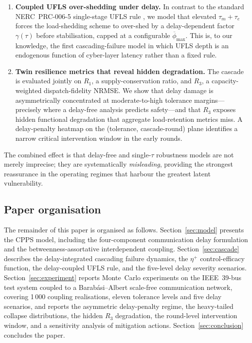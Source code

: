 \begin{enumerate}
\item \textbf{Coupled UFLS over-shedding under delay.}  In contrast
  to the standard NERC~PRC-006-5 single-stage UFLS rule
  \citep{NERC_PRC006}, we model that elevated $\tau_m+\tau_e$
  forces the load-shedding scheme to over-shed by a delay-dependent
  factor $\gamma(\tau)$ before stabilisation, capped at a
  configurable $\overline{\phi}_{\max}$.  This is, to our knowledge,
  the first cascading-failure model in which UFLS depth is an
  endogenous function of cyber-layer latency rather than a fixed
  rule.

\item \textbf{Twin resilience metrics that reveal hidden degradation.}
  The cascade is evaluated jointly on $R_1$, a supply-conservation
  ratio, and $R_3$, a capacity-weighted dispatch-fidelity NRMSE.  We
  show that delay damage is asymmetrically concentrated at
  moderate-to-high tolerance margins---precisely where a delay-free
  analysis predicts safety---and that $R_3$ exposes hidden functional
  degradation that aggregate load-retention metrics miss.  A
  delay-penalty heatmap on the (tolerance, cascade-round) plane
  identifies a narrow critical intervention window in the early
  rounds.
\end{enumerate}

\noindent
The combined effect is that delay-free and single-$\tau$ robustness
models are not merely imprecise; they are systematically
\emph{misleading}, providing the strongest reassurance in the operating
regimes that harbour the greatest latent vulnerability.

\subsection*{Paper organisation}

The remainder of this paper is organised as follows.
Section~\ref{sec:model} presents the CPPS model, including the
four-component communication delay formulation and the
betweenness-assortative interdependent coupling.
Section~\ref{sec:cascade} describes the delay-integrated cascading
failure dynamics, the $\eta^{+}$ control-efficacy function, the
delay-coupled UFLS rule, and the five-level delay severity scenarios.
Section~\ref{sec:experiment} reports Monte~Carlo experiments on the
IEEE~39-bus test system coupled to a Barab\'asi--Albert scale-free
communication network, covering 1\,000 coupling realisations, eleven
tolerance levels and five delay scenarios, and reports the asymmetric
delay-penalty regime, the heavy-tailed collapse distributions, the
hidden $R_3$ degradation, the round-level intervention window, and a
sensitivity analysis of mitigation actions.
Section~\ref{sec:conclusion} concludes the paper.
